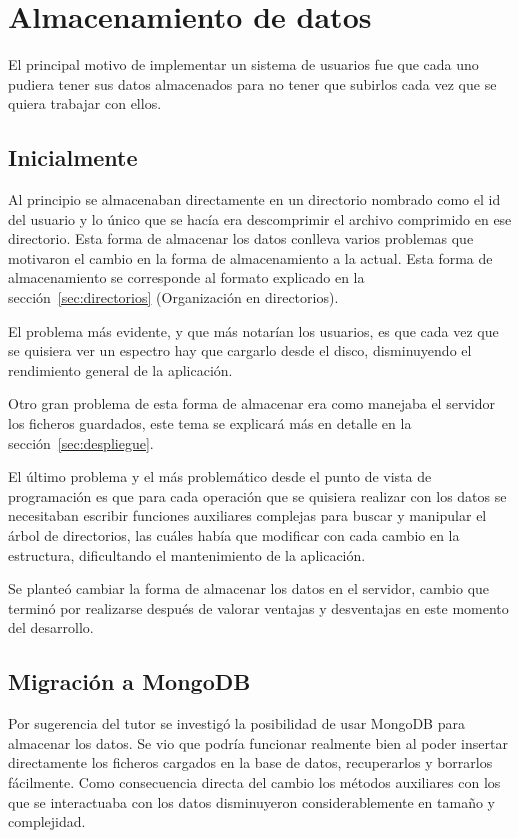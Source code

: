 
\section{Almacenamiento de datos}

El principal motivo de implementar un sistema de usuarios fue que cada uno
pudiera tener sus datos almacenados para no tener que subirlos cada vez que se
quiera trabajar con ellos.

\subsection{Inicialmente}

Al principio se almacenaban directamente en un directorio nombrado como el id
del usuario y lo único que se hacía era descomprimir el archivo comprimido en
ese directorio. Esta forma de almacenar los datos conlleva varios problemas que
motivaron el cambio en la forma de almacenamiento a la actual. Esta forma de
almacenamiento se corresponde al formato explicado en la
sección~\ref{sec:directorios} (Organización en directorios).

El problema más evidente, y que más notarían los usuarios, es que cada vez que
se quisiera ver un espectro hay que cargarlo desde el disco, disminuyendo el
rendimiento general de la aplicación.

Otro gran problema de esta forma de almacenar era como manejaba el servidor los
ficheros guardados, este tema se explicará más en detalle en la
sección~\ref{sec:despliegue}.

El último problema y el más problemático desde el punto de vista de programación
es que para cada operación que se quisiera realizar con los datos se necesitaban
escribir funciones auxiliares complejas para buscar y manipular el árbol de
directorios, las cuáles había que modificar con cada cambio en la estructura,
dificultando el mantenimiento de la aplicación.

Se planteó cambiar la forma de almacenar los datos en el servidor, cambio que
terminó por realizarse después de valorar ventajas y desventajas en este momento
del desarrollo.

\subsection{Migración a MongoDB}\label{sec:migrate-mongo}

Por sugerencia del tutor se investigó la posibilidad de usar MongoDB para
almacenar los datos. Se vio que podría funcionar realmente bien al poder
insertar directamente los ficheros cargados en la base de datos, recuperarlos y
borrarlos fácilmente. Como consecuencia directa del cambio los métodos
auxiliares con los que se interactuaba con los datos disminuyeron
considerablemente en tamaño y complejidad.

